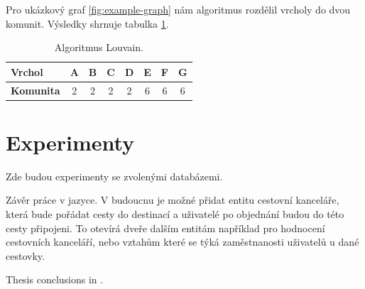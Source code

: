 \documentclass[
  program=infoi,
  biblatex=true,
  sourcecodes=true,
  figures=true,
  glossaries=false,
  index
]{kidiplom}
\begin{document}
Pro ukázkový graf \ref{fig:example-graph} nám algoritmus rozdělil vrcholy do dvou komunit. Výsledky shrnuje tabulka \ref{tab:louvain}.

\begin{table}[h]
\begin{center}
\caption{Algoritmus Louvain.}
\label{tab:louvain}
\begin{tabular}{ | l || c | c | c | c | c | c | c | }
 \hline
 \textbf{Vrchol} & A & B & C & D & E & F & G \\
 \hline
 \textbf{Komunita} & 2 & 2 & 2 & 2 & 6 & 6 & 6 \\
 \hline
\end{tabular}
\end{center}
\end{table}

\section{Experimenty}
Zde budou experimenty se zvolenými databázemi.

\begin{kiconclusions}
Závěr práce v  jazyce.
V budoucnu je možné přidat entitu cestovní kanceláře, která bude pořádat cesty do destinací a uživatelé po objednání budou do této cesty připojeni. To otevírá dveře dalším entitám například pro hodnocení cestovních kanceláří, nebo vztahům které se týká zaměstnanosti uživatelů u dané cestovky.
\end{kiconclusions}

\begin{kiconclusions}[english]
Thesis conclusions in .
\end{kiconclusions}






\nocite{*}
\printbibliography
\end{document}

